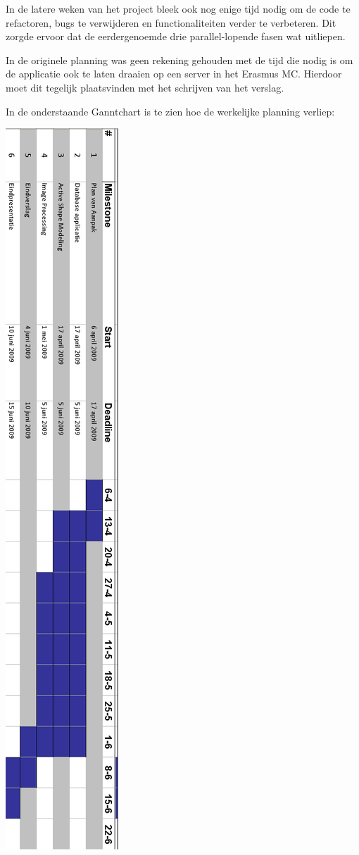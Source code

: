 In de latere weken van het project bleek ook nog enige tijd nodig om de code te
refactoren, bugs te verwijderen en functionaliteiten verder te verbeteren. Dit
zorgde ervoor dat de eerdergenoemde drie parallel-lopende fasen wat uitliepen.

In de originele planning was geen rekening gehouden met de tijd die nodig is om
de applicatie ook te laten draaien op een server in het Erasmus MC. Hierdoor
moet dit tegelijk plaatsvinden met het schrijven van het verslag.

In de onderstaande Ganntchart is te zien hoe de werkelijke planning verliep:

\includegraphics[height=\textheight]{ganntafter}
